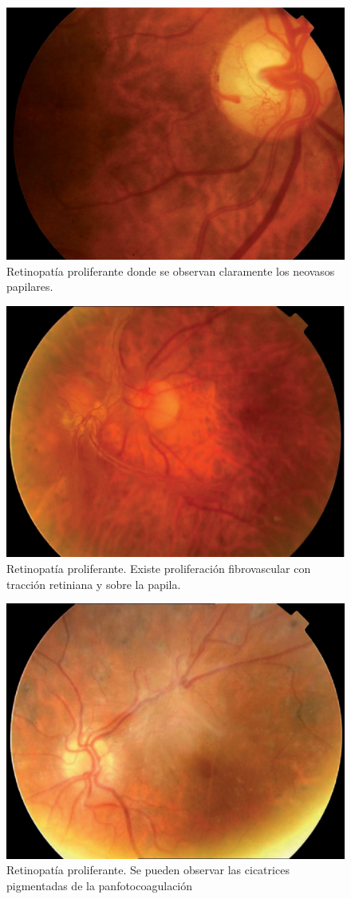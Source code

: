 \documentclass[12pt,letterpaper]{report}
\begin{document}
\begin{itemize}
\begin{figure}[p]
    \centering
    \includegraphics[width=.75\textwidth]{Img_C2_2.1/FIG_3.png}  
    \caption{Retinopatía proliferante donde se observan claramente los neovasos papilares.}
    \label{fig:fig3}
\end{figure}

\begin{figure}
    \centering
    \includegraphics[width=.75\textwidth]{Img_C2_2.1/FIG_4.png} 
    \caption{Retinopatía proliferante. Existe proliferación fibrovascular con tracción retiniana y sobre la
papila.}
    \label{fig:fig4}
\end{figure}
\medskip
\begin{figure}
    \centering
    \includegraphics[width=.75\textwidth]{Img_C2_2.1/FIG_5.png} 
    \caption{Retinopatía proliferante. Se pueden observar las cicatrices pigmentadas de la panfotocoagulación}
    \label{fig:fig5}
\end{figure}
\end{itemize}
\end{document}

